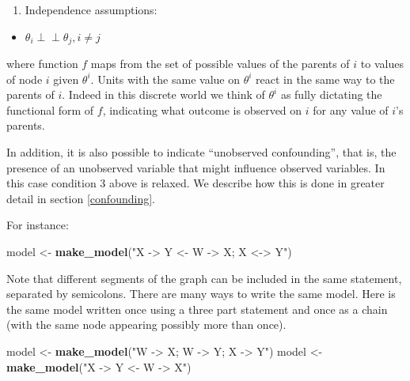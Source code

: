 \documentclass[
  12pt,
]{book}
\newenvironment{Shaded}{\begin{snugshade}}{\end{snugshade}}
\newcommand{\FunctionTok}[1]{\textcolor[rgb]{0.13,0.29,0.53}{\textbf{#1}}}
\newcommand{\NormalTok}[1]{#1}
\newcommand{\OtherTok}[1]{\textcolor[rgb]{0.56,0.35,0.01}{#1}}
\newcommand{\StringTok}[1]{\textcolor[rgb]{0.31,0.60,0.02}{#1}}
\providecommand{\tightlist}{%
  \setlength{\itemsep}{0pt}\setlength{\parskip}{0pt}}
\begin{document}
\begin{enumerate}
\def\labelenumi{\arabic{enumi}.}
\setcounter{enumi}{2}
\tightlist
\item
  Independence assumptions:\\
\end{enumerate}

\begin{itemize}
\tightlist
\item
  \(\theta_i \perp\!\!\! \perp \theta_j, i\neq j\)
\end{itemize}

where function \(f\) maps from the set of possible values of the parents of \(i\) to values of node \(i\) given \(\theta^i\). Units with the same value on \(\theta^i\) react in the same way to the parents of \(i\). Indeed in this discrete world we think of \(\theta^i\) as fully dictating the functional form of \(f\), indicating what outcome is observed on \(i\) for any value of \(i\)'s parents.

In addition, it is also possible to indicate ``unobserved confounding'', that is, the presence of an unobserved variable that might influence observed variables. In this case condition 3 above is relaxed. We describe how this is done in greater detail in section \ref{confounding}.

For instance:

\begin{Shaded}
\begin{Highlighting}[]
\NormalTok{model }\OtherTok{\textless{}{-}} \FunctionTok{make\_model}\NormalTok{(}\StringTok{"X {-}\textgreater{} Y \textless{}{-} W {-}\textgreater{} X; X \textless{}{-}\textgreater{} Y"}\NormalTok{)}
\end{Highlighting}
\end{Shaded}

Note that different segments of the graph can be included in the same statement, separated by semicolons. There are many ways to write the same model. Here is the same model written once using a three part statement and once as a chain (with the same node appearing possibly more than once).

\begin{Shaded}
\begin{Highlighting}[]
\NormalTok{model }\OtherTok{\textless{}{-}} \FunctionTok{make\_model}\NormalTok{(}\StringTok{"W {-}\textgreater{} X; W {-}\textgreater{} Y; X {-}\textgreater{} Y"}\NormalTok{)}
\NormalTok{model }\OtherTok{\textless{}{-}} \FunctionTok{make\_model}\NormalTok{(}\StringTok{"X {-}\textgreater{} Y \textless{}{-} W {-}\textgreater{} X"}\NormalTok{)}
\end{Highlighting}
\end{Shaded}
\end{document}

